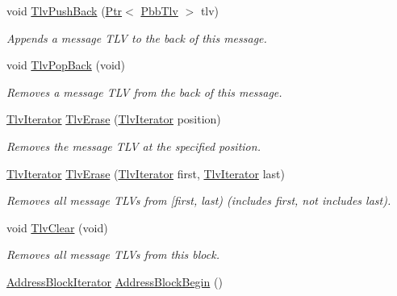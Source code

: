 \begin{DoxyCompactItemize}
void \hyperlink{classns3_1_1PbbMessage_aac70b2672f79765cf5cc5b6666018165}{Tlv\+Push\+Back} (\hyperlink{classns3_1_1Ptr}{Ptr}$<$ \hyperlink{classns3_1_1PbbTlv}{Pbb\+Tlv} $>$ tlv)
\begin{DoxyCompactList}\small\item\em Appends a message T\+LV to the back of this message. \end{DoxyCompactList}\item 
void \hyperlink{classns3_1_1PbbMessage_a945f05f41ab6aadf1c4299debbbef55b}{Tlv\+Pop\+Back} (void)
\begin{DoxyCompactList}\small\item\em Removes a message T\+LV from the back of this message. \end{DoxyCompactList}\item 
\hyperlink{classns3_1_1PbbMessage_ac37cff092f8d01346e2d9498b4b34afd}{Tlv\+Iterator} \hyperlink{classns3_1_1PbbMessage_a506e1d981af676b0df295965aff6982f}{Tlv\+Erase} (\hyperlink{classns3_1_1PbbMessage_ac37cff092f8d01346e2d9498b4b34afd}{Tlv\+Iterator} position)
\begin{DoxyCompactList}\small\item\em Removes the message T\+LV at the specified position. \end{DoxyCompactList}\item 
\hyperlink{classns3_1_1PbbMessage_ac37cff092f8d01346e2d9498b4b34afd}{Tlv\+Iterator} \hyperlink{classns3_1_1PbbMessage_a30bbf5ccce9227c6d850c7a2d420fbc2}{Tlv\+Erase} (\hyperlink{classns3_1_1PbbMessage_ac37cff092f8d01346e2d9498b4b34afd}{Tlv\+Iterator} first, \hyperlink{classns3_1_1PbbMessage_ac37cff092f8d01346e2d9498b4b34afd}{Tlv\+Iterator} last)
\begin{DoxyCompactList}\small\item\em Removes all message T\+L\+Vs from \mbox{[}first, last) (includes first, not includes last). \end{DoxyCompactList}\item 
void \hyperlink{classns3_1_1PbbMessage_aabfb2717000086ef151658931a4d3b4c}{Tlv\+Clear} (void)
\begin{DoxyCompactList}\small\item\em Removes all message T\+L\+Vs from this block. \end{DoxyCompactList}\item 
\hyperlink{classns3_1_1PbbMessage_a9ab666cb1f964e91878353ded8a8f303}{Address\+Block\+Iterator} \hyperlink{classns3_1_1PbbMessage_a389f90196ba0745c85d0d4c3634a9a7a}{Address\+Block\+Begin} ()
\item 

\end{DoxyCompactItemize}
